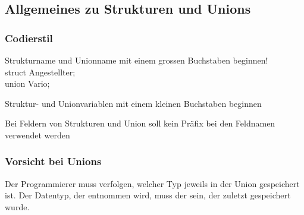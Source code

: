 	\subsection{Allgemeines zu Strukturen und Unions}
		\subsubsection{Codierstil}
			\begin{compactitem}
				\item Strukturname und Unionname mit einem grossen Buchstaben beginnen!\\
				struct Angestellter;\\
				union Vario;
				\item Struktur- und Unionvariablen mit einem kleinen Buchstaben beginnen
				\item Bei Feldern von Strukturen und Union soll kein Präfix bei den Feldnamen verwendet werden
			\end{compactitem}
		\subsubsection{Vorsicht bei Unions}	
			\begin{compactitem}
				\item Der Programmierer muss verfolgen, welcher Typ jeweils in der Union gespeichert ist. Der Datentyp, der entnommen wird, muss der sein, der zuletzt gespeichert wurde. 
			\end{compactitem}		